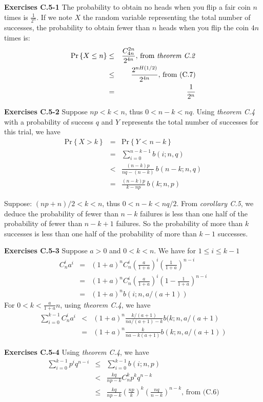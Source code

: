 \documentclass[a4paper,12pt]{article}
\newcommand{\newpar}[1]
{\bigskip \noindent \textbf{Exercises #1} \newline}
\newcommand{\prob}[1]{\mathrm{Pr}\left\{ #1 \right\}}
\begin{document}
\newpar{C.5-1}
The probability to obtain no heads when you flip a fair coin $n$ times
is $\frac{1}{2^n}$.  If we note $X$ the random variable representing
the total number of successes, the probability to obtain fewer than
$n$ heads when you flip the coin $4n$ times is:
\begin{eqnarray*}
  \prob{X \le n} &\le& \frac{C_{4n}^{2n}}{2^{4n}},\,\mbox{from
    \emph{theorem C.2}} \\ &\le&
  \frac{2^{nH(1/2)}}{2^{4n}},\,\mbox{from (C.7)} \\ &=&
  \frac{1}{2^n}
\end{eqnarray*}

\newpar{C.5-2}
Suppose $np < k < n$, thus $0 < n-k < nq$.  Using \emph{theorem C.4}
with a probability of success $q$ and $Y$ represents the total number
of successes for this trial, we have
\begin{eqnarray*}
  \prob{X > k} &=& \prob{Y < n-k} \\
  &=& \sum_{i=0}^{n-k-1}b(i; n, q) \\
  &<& \frac{(n-k)p}{nq - (n-k)} \,b(n-k;n,q) \\
  &=& \frac{(n-k)p}{k - np}\,b(k;n,p)
\end{eqnarray*}

Suppose: $(np+n)/2 < k < n$, thus $0 < n - k < nq/2$.  From
\emph{corollary C.5}, we deduce the probability
of fewer than $n-k$ failures is less than one half of the probability
of fewer than $n-k+1$ failures.  So the probability of more than $k$
successes is less than one half of the probability of more than $k-1$
successes.

\newpar{C.5-3}
Suppose $a>0$ and $0 < k < n$.  We have for $1\le i\le k-1$
\begin{eqnarray*}
  C_n^i a^i &=& (1+a)^n C_n^i \left(\frac{a}{1+a}\right)^i
  \left(\frac{1}{1+a}\right)^{n-i} \\
  &=& (1+a)^n C_n^i \left(\frac{a}{1+a}\right)^i
  \left(1 - \frac{1}{1+a}\right)^{n-i} \\
  &=& (1+a)^n b(i; n, a/(a+1))
\end{eqnarray*}
For $0 < k < \frac{a}{1+a}n$, using \emph{theorem C.4}, we have
\begin{eqnarray*}
  \sum_{i=0}^{k-1}C_n^i a^i &<&
  (1+a)^n \frac{k/(a+1)}{na/(a+1) - k} b(k; n, a/(a+1) \\
  &=& (1+a)^n \frac{k}{na - k(a+1)}b(k; n, a/(a+1))
\end{eqnarray*}

\newpar{C.5-4}
Using \emph{theorem C.4}, we have
\begin{eqnarray*}
  \sum_{i=0}^{k-1}p^iq^{n-i} &\le& \sum_{i=0}^{k-1}b(i;n,p) \\
  &<& \frac{kq}{np-k}C_n^k p^k q^{n-k} \\
  &\le& \frac{kq}{np-k} \left(\frac{np}{k}\right)^k
  \left(\frac{nq}{n-k}\right)^{n-k},\,\mbox{from (C.6)}
\end{eqnarray*}
\end{document}
